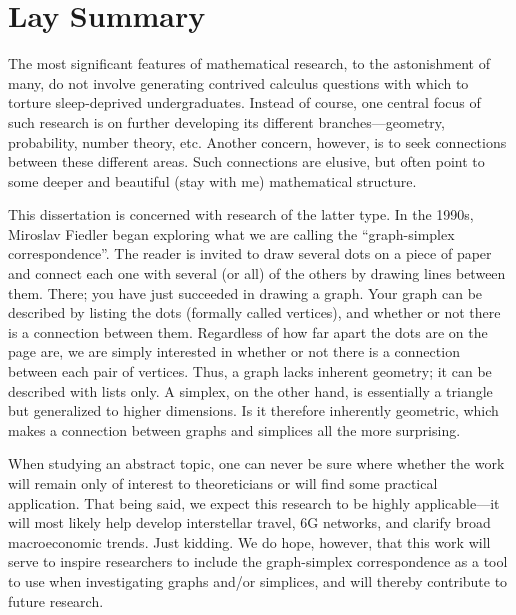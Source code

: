 \chapter*{Lay Summary}

The  most  significant features of mathematical research, to the astonishment of  many, do not involve generating contrived  calculus  questions with which to torture sleep-deprived undergraduates. 
Instead of course, one central focus of such research is on further developing  its different branches---geometry, probability, number theory, etc.  Another concern, however, is to seek connections between these different areas. Such  connections are elusive, but often point to some deeper and beautiful (stay with me) mathematical structure. 

This dissertation is concerned with research of the latter type. In  the 1990s, Miroslav Fiedler began exploring what we are calling the ``graph-simplex correspondence''. 
The  reader is invited  to draw several dots  on a piece of paper and connect each one with  several (or all) of the others by drawing  lines between them. There; you have  just succeeded in drawing a graph. Your graph can be  described  by listing the dots (formally  called vertices), and whether or not there is a  connection between  them. Regardless of how far  apart the dots  are on the page are, we are  simply interested in whether or not there is a  connection between each pair of vertices. Thus, a graph  lacks inherent  geometry; it  can  be described with  lists only. A simplex, on the other  hand, is essentially a triangle but generalized  to higher dimensions. Is it therefore inherently geometric, which makes a connection between graphs and simplices all the more surprising. 

When studying an abstract topic, one can never be  sure where whether the work will remain only of interest to theoreticians or will find some practical application. That being said, we expect this research to be highly applicable---it will most likely help develop interstellar travel, 6G networks, and clarify broad macroeconomic trends. Just kidding. We do hope, however, that this work will serve to inspire researchers to include the  graph-simplex correspondence as a tool to use when  investigating graphs and/or simplices, and will thereby contribute to future  research. 
 

